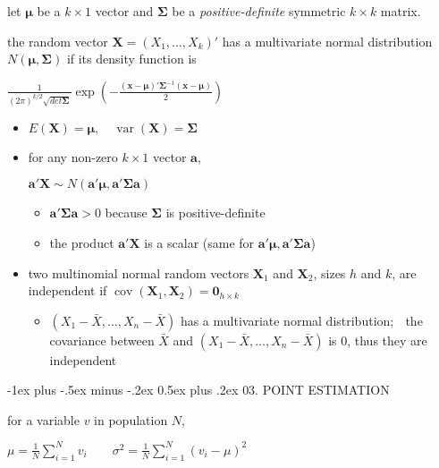 \documentclass[10pt, landscape]{article}
\makeatletter
\renewcommand{\section}{\@startsection{section}{1}{0mm}%
  {-1ex plus -.5ex minus -.2ex}%
  {0.5ex plus .2ex}%
{\normalfont\large\bfseries}}
\newcommand{\cov}{\mathop{\mathrm{cov}}}
\newcommand{\var}{\mathop{\mathrm{var}}}
\newcommand{\Xbar}{\bar{X}}
\newcommand{\seq}[2][n]{#2_1, \dots, #2_{#1}}
\makeatother
\begin{document}
\begin{multicols*}{4}
  let $\bm{\mu}$ be a $k \times 1$ vector and $\bm{\Sigma}$ be a \textit{positive-definite} symmetric $k \times k$ matrix.

  \begin{tightcenter}
    the random vector $\bm{X} = (\seq[k]{X})'$ has a multivariate normal distribution $N(\bm{\mu}, \bm{\Sigma})$ if its density function is 

    \( {\displaystyle{ \frac{1}{(2\pi)^{k/2} \sqrt{det\bm{\Sigma}}} \exp \left(-\frac{(\bm{x} - \bm{\mu})' \bm{\Sigma}^{-1}(\bm{x} - \bm{\mu})}{2}\right) }} \) 
  \end{tightcenter}

  \begin{itemize}
    \item $E(\bm{X}) = \bm{\mu}, \quad \var(\bm{X}) = \bm{\Sigma}$
    \item for any non-zero $k \times 1 $ vector $\bm{a}$, 
      \begin{tightcenter}
        $\bm{a'X} \sim N(\bm{a'\mu}, \bm{a'\Sigma a})$
      \end{tightcenter}
      \begin{itemize}
        \item $\bm{a}'\bm{\Sigma a} > 0$ because $\bm{\Sigma}$ is positive-definite
        \item the product $\bm{a'X}$ is a scalar (same for $\bm{a'\mu}, \bm{a'\Sigma a}$)
      \end{itemize}
    \item two multinomial normal random vectors $\bm{X}_1$ and $\bm{X}_2$, sizes $h$ and $k$, are independent if $\cov (\bm{X}_1, \bm{X}_2) = \bm{0}_{h \times k}$
      \begin{itemize}
        \item $(X_1-\Xbar, \dots, X_n - \Xbar)$ has a multivariate normal distribution; $\;$
          the covariance between $\Xbar$ and $(X_1-\Xbar, \dots, X_n - \Xbar)$ is $0$, thus they are independent
      \end{itemize}
  \end{itemize}

  \section{03. POINT ESTIMATION}

  for a variable $v$ in population $N$, 
  \begin{tightcenter}
    \( {\displaystyle{ 
        \mu = \frac{1}{N} \sum^N_{i=1} v_i
        \quad \quad 
        \sigma^2 = \frac{1}{N} \sum^N_{i=1} (v_i - \mu)^2
    }} \) 
  \end{tightcenter}


\end{multicols*}
\end{document}
